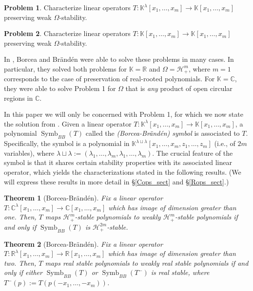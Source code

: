 \documentclass{article}
\newtheorem{theorem}{Theorem}[section]
\theoremstyle{definition}
\newtheorem{problem}{Problem}
\theoremstyle{plain}
\newcommand{\C}{\mathbb{C}}
\newcommand{\R}{\mathbb{R}}
\newcommand{\K}{\mathbb{K}}
\newcommand{\UHP}{\mathcal{H}_+}
\DeclareMathOperator{\Symb}{Symb}
\begin{document}
\begin{problem}
    Characterize linear operators $T: \K^\lambda[x_1,\ldots,x_m] \to \K[x_1,\ldots,x_m]$ preserving weak $\Omega$-stability.
\end{problem}

\begin{problem}
    Characterize linear operators $T: \K[x_1,\ldots,x_m] \to \K[x_1,\ldots,x_m]$ preserving weak $\Omega$-stability.
\end{problem}

In \cite{bb1}, Borcea and Br{\"a}nd{\'e}n were able to solve these problems in many cases. In particular, they solved both problems for $\K = \R$ and $\Omega = \UHP^m$, where $m=1$ corresponds to the case of preservation of real-rooted polynomials. For $\K = \C$, they were able to solve Problem 1 for $\Omega$ that is \emph{any} product of open circular regions in $\C$.

In this paper we will only be concerned with Problem 1, for which we now state the solution from \cite{bb1}. Given a linear operator $T: \K^\lambda[x_1,\ldots,x_m] \to \K[x_1,\ldots,x_m]$, a polynomial $\Symb_{BB}(T)$ called the \emph{(Borcea-Br{\"a}nd{\'e}n) symbol} is associated to $T$. Specifically, the symbol is a polynomial in $\K^{\lambda \sqcup \lambda}[x_1,\ldots,x_m, z_1,\ldots,z_m]$ (i.e., of $2m$ variables), where $\lambda \sqcup \lambda := (\lambda_1,\ldots,\lambda_m,\lambda_1,\ldots,\lambda_m)$. The crucial feature of the symbol is that it shares certain stability properties with its associated linear operator, which yields the characterizations stated in the following results. (We will express these results in more detail in \S\ref{Cops_sect} and \S\ref{Rops_sect}.)

\begin{theorem}[Borcea-Br{\"a}nd{\'e}n]\label{BB_Cops_thm}
    Fix a linear operator $T: \C^\lambda[x_1,\ldots,x_m] \to \C[x_1,\ldots,x_m]$ which has image of dimension greater than one. Then, $T$ maps $\UHP^m$-stable polynomials to weakly $\UHP^m$-stable polynomials if and only if $\Symb_{BB}(T)$ is $\UHP^{2m}$-stable.
\end{theorem}

\begin{theorem}[Borcea-Br{\"a}nd{\'e}n]\label{BB_Rops_thm}
    Fix a linear operator $T: \R^\lambda[x_1,\ldots,x_m] \to \R[x_1,\ldots,x_m]$ which has image of dimension greater than two. Then, $T$ maps real stable polynomials to weakly real stable polynomials if and only if either $\Symb_{BB}(T)$ or $\Symb_{BB}(T^-)$ is real stable, where $T^-(p) := T(p(-x_1,\ldots,-x_m))$.
\end{theorem}
\end{document}
